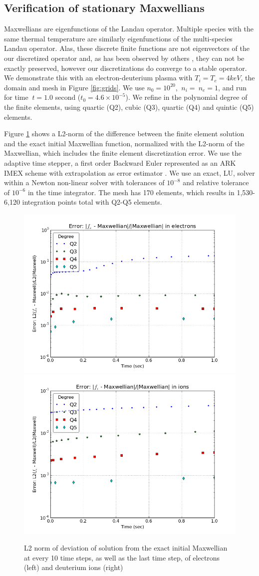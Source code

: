 \documentclass[12pt]{siamart}
\begin{document}
\subsection{Verification of stationary Maxwellians}
Maxwellians are eigenfunctions of the Landau operator.
Multiple species with the same thermal temperature are similarly eigenfunctions of the multi-species Landau operator.
Alas, these discrete finite functions are not eigenvectors of the our discretized operator and, as has been observed by others \cite{Hager2016}, they can not be exactly preserved, however our discretizations do converge to a stable operator.
We demonstrate this with an electron-deuterium plasma with  $T_i=T_e=4 keV$, the domain and mesh in Figure \ref{fig:grids}. 
We use $n_0=10^{20}$, $\ n_i = \ n_e = 1$, and run for time $\ t = 1.0$ second ($t_0 = 4.6\times 10^{-5}$).
We refine in the polynomial degree of the finite elements, using quartic (Q2), cubic (Q3), quartic (Q4) and quintic (Q5) elements.

Figure \ref{fig:stable} shows a L2-norm of the difference between the finite element solution and the exact initial Maxwellian function, normalized with the L2-norm of the Maxwellian, which includes the finite element discretization error.
We use the adaptive time stepper, a first order Backward Euler represented as an ARK IMEX scheme with extrapolation as error estimator \cite{abhyankar2018petscts}.
We use an exact, LU, solver within a Newton non-linear solver with tolerances of $10^{-8}$ and relative tolerance of $10^{-6}$ in the time integrator.
The mesh has 170 elements, which results in 1,530-6,120 integration points total with Q2-Q5 elements.
\begin{figure}[htbp]
\begin{center}
\includegraphics[width=.4\linewidth]{e_L2error.png}
\includegraphics[width=.4\linewidth]{i_L2error.png}
\caption{L2 norm of deviation of solution from the exact initial Maxwellian at every 10 time steps, as well as the last time step, of electrons (left) and deuterium ions (right)}
\label{fig:stable}
\end{center}
\end{figure}
\end{document}
